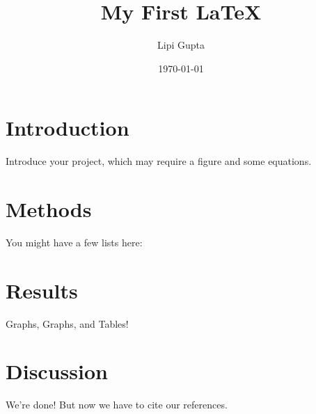 \documentclass[a4paper]{article}
\begin{document}
\title{My First \LaTeX}
\author{Lipi Gupta}
\date{\today{}}
\maketitle


\section{Introduction}

Introduce your project, which may require a figure and some equations. 




\section{Methods}

You might have a few lists here:


\section{Results}

Graphs, Graphs, and Tables!


\section{Discussion}

We're done! But now we have to cite our references.

\end{document}
